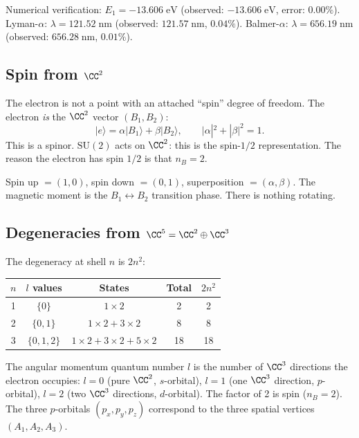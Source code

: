 Numerical verification: $E_1 = -13.606\;\text{eV}$ (observed: $-13.606\;\text{eV}$, error: $0.00\%$). Lyman-$\alpha$: $\lambda = 121.52\;\text{nm}$ (observed: $121.57\;\text{nm}$, $0.04\%$). Balmer-$\alpha$: $\lambda = 656.19\;\text{nm}$ (observed: $656.28\;\text{nm}$, $0.01\%$).

\subsection{Spin from $\CC^2$}

The electron is not a point with an attached ``spin'' degree of freedom. The electron \emph{is} the $\CC^2$ vector $(B_1, B_2)$:
\begin{equation}
|e\rangle = \alpha|B_1\rangle + \beta|B_2\rangle, \qquad |\alpha|^2 + |\beta|^2 = 1.
\end{equation}
This is a spinor. $\text{SU}(2)$ acts on $\CC^2$: this is the spin-$1/2$ representation. The reason the electron has spin $1/2$ is that $n_B = 2$.

Spin up $= (1, 0)$, spin down $= (0, 1)$, superposition $= (\alpha, \beta)$. The magnetic moment is the $B_1 \leftrightarrow B_2$ transition phase. There is nothing rotating.

\subsection{Degeneracies from $\CC^5 = \CC^2 \oplus \CC^3$}

The degeneracy at shell $n$ is $2n^2$:
\begin{center}
\begin{tabular}{ccccc}
\hline
$n$ & $l$ values & States & Total & $2n^2$ \\
\hline
1 & $\{0\}$ & $1 \times 2$ & 2 & 2 \\
2 & $\{0, 1\}$ & $1 \times 2 + 3 \times 2$ & 8 & 8 \\
3 & $\{0, 1, 2\}$ & $1 \times 2 + 3 \times 2 + 5 \times 2$ & 18 & 18 \\
\hline
\end{tabular}
\end{center}

The angular momentum quantum number $l$ is the number of $\CC^3$ directions the electron occupies: $l = 0$ (pure $\CC^2$, $s$-orbital), $l = 1$ (one $\CC^3$ direction, $p$-orbital), $l = 2$ (two $\CC^3$ directions, $d$-orbital). The factor of 2 is spin ($n_B = 2$). The three $p$-orbitals $(p_x, p_y, p_z)$ correspond to the three spatial vertices $(A_1, A_2, A_3)$.

